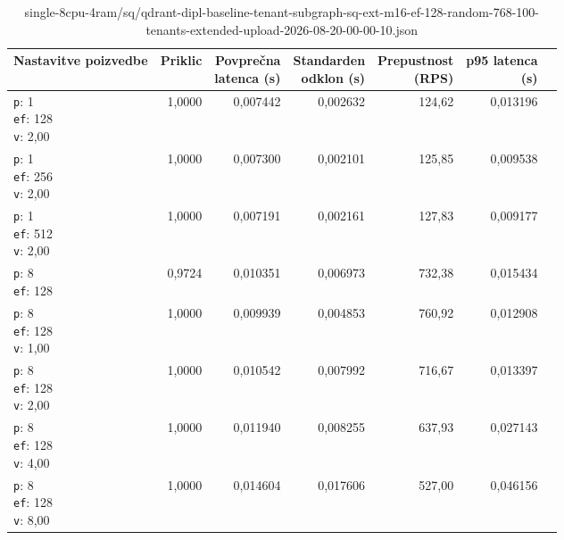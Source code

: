 \begin{table}[htbp]
  \centering
\small
  \caption{single-8cpu-4ram/sq/qdrant-dipl-baseline-tenant-subgraph-sq-ext-m16-ef-128-random-768-100-tenants-extended-upload-2026-08-20-00-00-10.json}
  \label{tab:single-8cpu-4ram:sq:qdrant-dipl-baseline-tenant-subgraph-sq-ext-m16-ef-128-random-768-100-tenants-extended-upload-2026-08-20-00-00-10.json}
  \begin{tabularx}{\textwidth}{Xrrrrrr}
    \toprule
    Nastavitve poizvedbe & Priklic & \makecell{Povprečna\\latenca (s)} & \makecell{Standarden\\odklon (s)} & \makecell{Prepustnost\\(RPS)} & \makecell{p95 latenca\\(s)}  \\
    \midrule
    \makecell{\texttt{p}: 1\\\texttt{ef}: 128\\\texttt{v}: 2,00} & 1,0000 & 0,007442 & 0,002632 & 124,62 & 0,013196 \\
    \makecell{\texttt{p}: 1\\\texttt{ef}: 256\\\texttt{v}: 2,00} & 1,0000 & 0,007300 & 0,002101 & 125,85 & 0,009538 \\
    \makecell{\texttt{p}: 1\\\texttt{ef}: 512\\\texttt{v}: 2,00} & 1,0000 & 0,007191 & 0,002161 & 127,83 & 0,009177 \\
    \makecell{\texttt{p}: 8\\\texttt{ef}: 128} & 0,9724 & 0,010351 & 0,006973 & 732,38 & 0,015434 \\
    \makecell{\texttt{p}: 8\\\texttt{ef}: 128\\\texttt{v}: 1,00} & 1,0000 & 0,009939 & 0,004853 & 760,92 & 0,012908 \\
    \makecell{\texttt{p}: 8\\\texttt{ef}: 128\\\texttt{v}: 2,00} & 1,0000 & 0,010542 & 0,007992 & 716,67 & 0,013397 \\
    \makecell{\texttt{p}: 8\\\texttt{ef}: 128\\\texttt{v}: 4,00} & 1,0000 & 0,011940 & 0,008255 & 637,93 & 0,027143 \\
    \makecell{\texttt{p}: 8\\\texttt{ef}: 128\\\texttt{v}: 8,00} & 1,0000 & 0,014604 & 0,017606 & 527,00 & 0,046156 \\

\end{tabularx}
\end{table}
